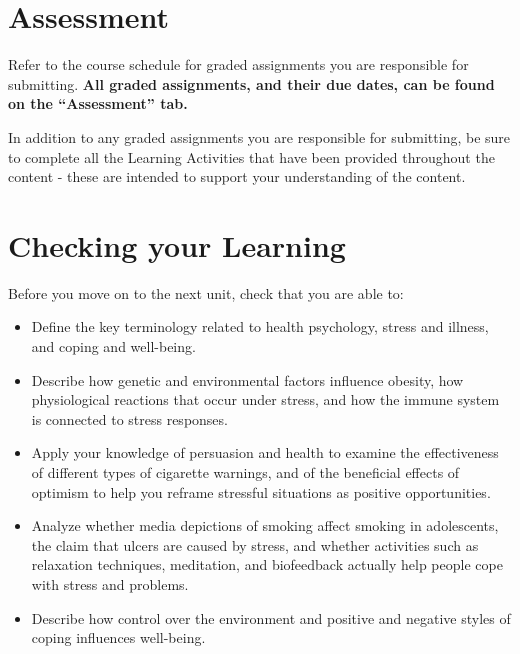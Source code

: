 \documentclass[
]{book}
\begin{document}
\hypertarget{assessment-10}{%
\section*{Assessment}\label{assessment-10}}

\begin{assessment}
Refer to the course schedule for graded assignments you are responsible for submitting. \textbf{All graded assignments, and their due dates, can be found on the ``Assessment'' tab.}

In addition to any graded assignments you are responsible for submitting, be sure to complete all the Learning Activities that have been provided throughout the content - these are intended to support your understanding of the content.
\end{assessment}

\hypertarget{checking-your-learning-10}{%
\section*{Checking your Learning}\label{checking-your-learning-10}}

\begin{progress}
Before you move on to the next unit, check that you are able to:

\begin{itemize}
\item
  Define the key terminology related to health psychology, stress and illness, and coping and well-being.
\item
  Describe how genetic and environmental factors influence obesity, how physiological reactions that occur under stress, and how the immune system is connected to stress responses.
\item
  Apply your knowledge of persuasion and health to examine the effectiveness of different types of cigarette warnings, and of the beneficial effects of optimism to help you reframe stressful situations as positive opportunities.
\item
  Analyze whether media depictions of smoking affect smoking in adolescents, the claim that ulcers are caused by stress, and whether activities such as relaxation techniques, meditation, and biofeedback actually help people cope with stress and problems.
\item
  Describe how control over the environment and positive and negative styles of coping influences well-being.
\end{itemize}
\end{progress}
\end{document}
